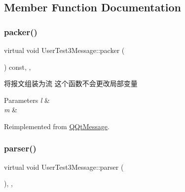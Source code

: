 \subsection{Member Function Documentation}
\mbox{\label{class_user_test3_message_a7c62be854d25bcab0f2c0d95d6f92c93}} 
\subsubsection{\texorpdfstring{packer()}{packer()}}
{\footnotesize\ttfamily virtual void User\+Test3\+Message\+::packer (\begin{DoxyParamCaption}\item[{Q\+Byte\+Array \&}]{ }\end{DoxyParamCaption}) const\hspace{0.3cm}{\ttfamily [inline]}, {\ttfamily [override]}, {\ttfamily [virtual]}}



将报文组装为流 这个函数不会更改局部变量 


\begin{DoxyParams}{Parameters}
{\em l} & \\
\hline
{\em m} & \\
\hline
\end{DoxyParams}


Reimplemented from \mbox{\hyperlink{class_q_qt_message_af1885c2c3628495808dca66ee8d72e14}{Q\+Qt\+Message}}.

\mbox{\label{class_user_test3_message_a5d53280632233833c6e151a86a5add32}} 
\subsubsection{\texorpdfstring{parser()}{parser()}}
{\footnotesize\ttfamily virtual void User\+Test3\+Message\+::parser (\begin{DoxyParamCaption}\item[{const Q\+Byte\+Array \&}]{ }\end{DoxyParamCaption})\hspace{0.3cm}{\ttfamily [inline]}, {\ttfamily [override]}, {\ttfamily [virtual]}}



